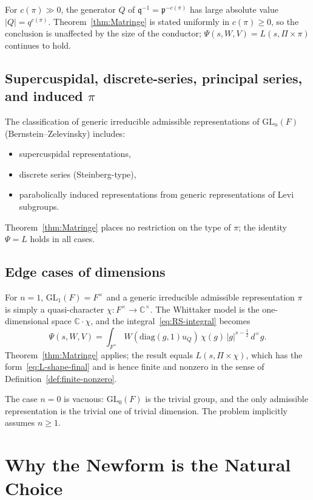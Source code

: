 \documentclass[12pt]{article}
\theoremstyle{definition}
\begin{document}
For $c(\pi)\gg 0$, the generator $Q$ of $\mathfrak{q}^{-1}=\mathfrak{p}^{-c(\pi)}$ has large absolute value $|Q|=q^{c(\pi)}$. Theorem~\ref{thm:Matringe} is stated uniformly in $c(\pi)\ge 0$, so the conclusion is unaffected by the size of the conductor; $\Psi(s,W,V)=L(s,\Pi\times\pi)$ continues to hold.

\subsection{Supercuspidal, discrete-series, principal series, and induced $\pi$}

The classification of generic irreducible admissible representations of $\mathrm{GL}_n(F)$ (Bernstein--Zelevinsky) includes:
\begin{itemize}
\item supercuspidal representations,
\item discrete series (Steinberg-type),
\item parabolically induced representations from generic representations of Levi subgroups.
\end{itemize}
Theorem~\ref{thm:Matringe} places no restriction on the type of $\pi$; the identity $\Psi=L$ holds in all cases.

\subsection{Edge cases of dimensions}

For $n=1$, $\mathrm{GL}_1(F)=F^\times$ and a generic irreducible admissible representation $\pi$ is simply a quasi-character $\chi:F^\times\to\mathbb{C}^\times$. The Whittaker model is the one-dimensional space $\mathbb{C}\cdot\chi$, and the integral~\eqref{eq:RS-integral} becomes
$$\Psi(s,W,V)=\int_{F^\times}W(\mathrm{diag}(g,1)u_Q)\,\chi(g)\,|g|^{s-\tfrac12}\,d^\times g.$$
Theorem~\ref{thm:Matringe} applies; the result equals $L(s,\Pi\times\chi)$, which has the form~\eqref{eq:L-shape-final} and is hence finite and nonzero in the sense of Definition~\ref{def:finite-nonzero}.

The case $n=0$ is vacuous: $\mathrm{GL}_0(F)$ is the trivial group, and the only admissible representation is the trivial one of trivial dimension. The problem implicitly assumes $n\ge 1$.

\section{Why the Newform is the Natural Choice}
\end{document}
